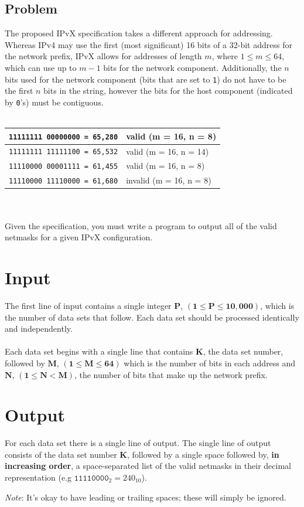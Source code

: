 \documentclass[11pt]{article}
\begin{document}
\subsection{Problem}
The proposed IPvX specification takes a different approach for addressing. Whereas IPv4 may use the first (most significant) 16 bits of a 32-bit address for the network prefix, IPvX allows for addresses of length $m$, where $1 \le m \le 64$, which can use up to $m-1$ bits for the network component. Additionally, the $n$ bits used for the network component (bits that are set to \texttt{1}) do not have to be the first $n$ bits in the string, however the bits for the host component (indicated by \texttt{0}'s) must be contiguous.
\\\\ 
\begin{tabularx}{\textwidth}{|X|X|}
	\hline
	\texttt{11111111 00000000 = 65,280} & valid (m = 16, n = 8)\\ \hline
	\texttt{11111111 11111100 = 65,532} & valid (m = 16, n = 14)\\ \hline
	\texttt{11110000 00001111 = 61,455} & valid (m = 16, n = 8)\\ \hline
	\texttt{11110000 11110000 = 61,680} & invalid (m = 16, n = 8)\\ \hline
\end{tabularx}
\\\\
Given the specification, you must write a program to output all of the valid netmasks for a given IPvX configuration.

\section{Input}
The first line of input contains a single integer $\boldsymbol{P}$, $(\boldsymbol{1} \le \boldsymbol{P} \le \boldsymbol{10,000})$, which is the number of data sets that follow. Each
data set should be processed identically and independently.
\\\\
Each data set begins with a single line that contains $\boldsymbol{K}$, the data
set number, followed by $\boldsymbol{M}$, $(\boldsymbol{1} \le \boldsymbol{M} \le \boldsymbol{64})$
which is the number of bits in each address and  $\boldsymbol{N}$,
$(\boldsymbol{1} \le \boldsymbol{N} < \boldsymbol{M})$, the number of bits that make up the network prefix.

\section{Output}
For each data set there is a single line of output. The single line of output
consists of the data set number $\boldsymbol{K}$, followed by a single space
followed by, \textbf{in increasing order}, a space-separated list of the valid netmasks
in their decimal representation (e.g $\texttt{11110000}_2 = 240_{10}$).
\begin{center}\emph{Note}: It's okay to have leading or trailing spaces; these will simply be ignored.\end{center}
\end{document}
